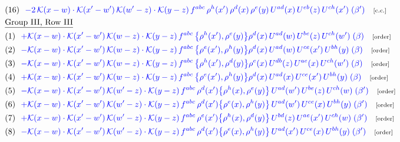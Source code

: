 \documentclass[9pt]{article}
\begin{document}
\begin{align}
&\quad\text{(16)}\ \ \textcolor{blue}{-2\,\mathcal{K}(x-w)\cdot\mathcal{K}(x'-w')\,\mathcal{K}(w'-z)\cdot\mathcal{K}(y-z)\, f^{abc}\,\rho^{h}(x')\,\rho^{d}(x)\,\rho^{e}(y)\,U^{ad}(x)\,U^{eb}(z)\,U^{ch}(x')\;(\beta')}\quad\text{\scriptsize[c.c.]}\notag\\
&\quad\underline{\text{Group III, Row III}}\notag\\
&\quad\text{(1)}\ \ \textcolor{blue}{+\mathcal{K}(x-w)\cdot\mathcal{K}(x'-w')\,\mathcal{K}(w-z)\cdot\mathcal{K}(y-z)\, f^{abc}\,\big\{\rho^{h}(x'),\rho^{e}(y)\big\}\rho^{d}(x)\,U^{ad}(w)\,U^{be}(z)\,U^{ch}(w')\;(\beta)}\quad\text{\scriptsize[order]}\notag\\
&\quad\text{(2)}\ \ \textcolor{blue}{-\mathcal{K}(x-w)\cdot\mathcal{K}(x'-w')\,\mathcal{K}(w-z)\cdot\mathcal{K}(y-z)\, f^{abc}\,\big\{\rho^{e}(x'),\rho^{h}(y)\big\}\rho^{d}(x)\,U^{ad}(w)\,U^{ce}(x')\,U^{bh}(y)\;(\beta)}\quad\text{\scriptsize[order]}\notag\\
&\quad\text{(3)}\ \ \textcolor{blue}{-\mathcal{K}(x-w)\cdot\mathcal{K}(x'-w')\,\mathcal{K}(w-z)\cdot\mathcal{K}(y-z)\, f^{abc}\,\big\{\rho^{h}(x'),\rho^{d}(y)\big\}\rho^{e}(x)\,U^{db}(z)\,U^{ae}(x)\,U^{ch}(w')\;(\beta)}\quad\text{\scriptsize[order]}\notag\\
&\quad\text{(4)}\ \ \textcolor{blue}{+\mathcal{K}(x-w)\cdot\mathcal{K}(x'-w')\,\mathcal{K}(w-z)\cdot\mathcal{K}(y-z)\, f^{abc}\,\big\{\rho^{e}(x'),\rho^{h}(y)\big\}\rho^{d}(x)\,U^{ad}(x)\,U^{ce}(x')\,U^{bh}(y)\;(\beta)}\quad\text{\scriptsize[order]}\notag\\
&\quad\text{(5)}\ \ \textcolor{blue}{-\mathcal{K}(x-w)\cdot\mathcal{K}(x'-w')\,\mathcal{K}(w'-z)\cdot\mathcal{K}(y-z)\, f^{abc}\,\rho^{d}(x')\big\{\rho^{h}(x),\rho^{e}(y)\big\}\,U^{ad}(w')\,U^{be}(z)\,U^{ch}(w)\;(\beta')}\quad\text{\scriptsize[order]}\notag\\
&\quad\text{(6)}\ \ \textcolor{blue}{+\mathcal{K}(x-w)\cdot\mathcal{K}(x'-w')\,\mathcal{K}(w'-z)\cdot\mathcal{K}(y-z)\, f^{abc}\,\rho^{d}(x')\big\{\rho^{e}(x),\rho^{h}(y)\big\}\,U^{ad}(w')\,U^{ce}(x)\,U^{bh}(y)\;(\beta')}\quad\text{\scriptsize[order]}\notag\\
&\quad\text{(7)}\ \ \textcolor{blue}{+\mathcal{K}(x-w)\cdot\mathcal{K}(x'-w')\,\mathcal{K}(w'-z)\cdot\mathcal{K}(y-z)\, f^{abc}\,\rho^{e}(x')\big\{\rho^{h}(x),\rho^{d}(y)\big\}\,U^{bd}(z)\,U^{ae}(x')\,U^{ch}(w)\;(\beta')}\quad\text{\scriptsize[order]}\notag\\
&\quad\text{(8)}\ \ \textcolor{blue}{-\mathcal{K}(x-w)\cdot\mathcal{K}(x'-w')\,\mathcal{K}(w'-z)\cdot\mathcal{K}(y-z)\, f^{abc}\,\rho^{d}(x')\big\{\rho^{e}(x),\rho^{h}(y)\big\}\,U^{ad}(x')\,U^{ce}(x)\,U^{bh}(y)\;(\beta')}\quad\text{\scriptsize[order]}\notag\\

\end{align}
\end{document}

